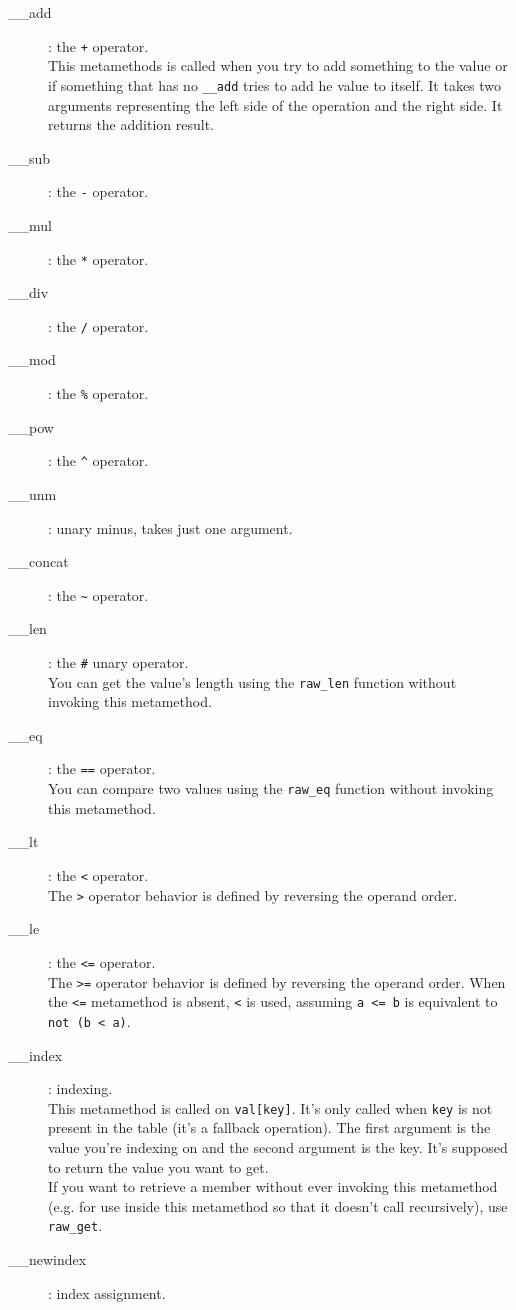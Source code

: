 \documentclass{article}
\begin{document}
\begin{description}
\item[__add]: the \verb|+| operator. \hfill \\
This metamethods is called when you try to add something to the value or
if something that has no \verb|__add| tries to add he value to itself.
It takes two arguments representing the left side of the operation and
the right side. It returns the addition result.
\item[__sub]: the \verb|-| operator.
\item[__mul]: the \verb|*| operator.
\item[__div]: the \verb|/| operator.
\item[__mod]: the \verb|%| operator.
\item[__pow]: the \verb|^| operator.
\item[__unm]: unary minus, takes just one argument.
\item[__concat]: the \verb|~| operator.
\item[__len]: the \verb|#| unary operator. \hfill \\
You can get the value's length using the \verb|raw_len| function without
invoking this metamethod.
\item[__eq]: the \verb|==| operator. \hfill \\
You can compare two values using the \verb|raw_eq| function without invoking
this metamethod.
\item[__lt]: the \verb|<| operator. \hfill \\
The \verb|>| operator behavior is defined by reversing the operand order.
\item[__le]: the \verb|<=| operator. \hfill \\
The \verb|>=| operator behavior is defined by reversing the operand order.
When the \verb|<=| metamethod is absent, \verb|<| is used, assuming
\verb|a <= b| is equivalent to \verb|not (b < a)|.
\item[__index]: indexing. \hfill \\
This metamethod is called on \verb|val[key]|. It's only called when
\verb|key| is not present in the table (it's a fallback operation). The
first argument is the value you're indexing on and the second argument
is the key. It's supposed to return the value you want to get.\\
If you want to retrieve a member without ever invoking this metamethod (e.g.
for use inside this metamethod so that it doesn't call recursively), use
\verb|raw_get|.
\item[__newindex]: index assignment. \hfill \\

\end{description}
\end{document}
